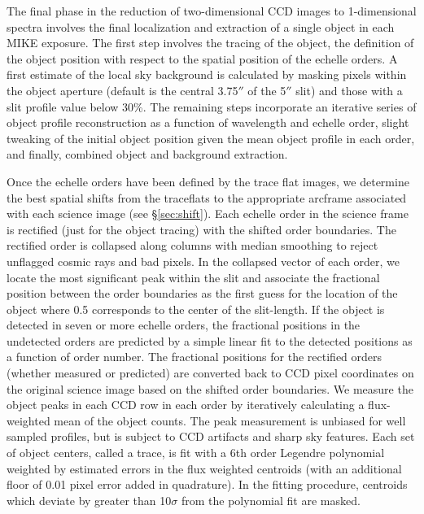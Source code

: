 \documentclass[12pt,preprint]{aastex}
\begin{document}
The final phase in the reduction of two-dimensional CCD images
to 1-dimensional spectra involves the final localization and extraction
of a single object in each MIKE exposure.  The first step involves the tracing
of the object, the definition of the object position with respect to
the spatial position of the echelle orders.  
A first estimate of the local sky background is 
calculated by masking pixels within the object aperture 
(default is the central 3.75$''$ of the 5$''$ slit) and those with
a slit profile value below 30\%.
The remaining steps incorporate an iterative series of 
object profile reconstruction as a function of wavelength and echelle order, 
slight tweaking of the initial object position given the mean 
object profile in each order, and finally, combined object and background
extraction.

Once the echelle orders have been defined by the trace flat images, we determine
the best spatial shifts from the traceflats to the appropriate arcframe
associated with each science image (see \S\ref{sec:shift}).  
Each echelle order in the science frame
is rectified (just for the object tracing) with the shifted order boundaries.
The rectified order is collapsed along columns with median smoothing to reject
unflagged cosmic rays and bad pixels.  In the collapsed vector of each order, 
we locate the most significant peak within the slit
and associate the fractional position 
between the order boundaries as the first guess for the location of 
the object where 0.5 corresponds to the center of the slit-length.
If the object is detected in seven or more echelle
orders, the fractional positions in the undetected orders 
are predicted by a simple linear fit to the detected positions
as a function of order number.  The fractional positions 
for the rectified orders (whether measured
or predicted) are converted back to CCD pixel coordinates on the original 
science image based on the shifted order boundaries.  We measure the object 
peaks in each CCD row in each order by iteratively calculating a flux-weighted
mean of the object counts.  The peak measurement is unbiased for well sampled
profiles, but is subject to CCD artifacts and sharp sky features.  Each
set of object centers, called a trace, 
is fit with a 6th order Legendre polynomial
weighted by estimated errors in the flux weighted centroids (with an additional
floor of 0.01 pixel error added in quadrature).  In the fitting procedure,
centroids which deviate by greater than 10$\sigma$ from the polynomial fit
are masked.  
\end{document}

